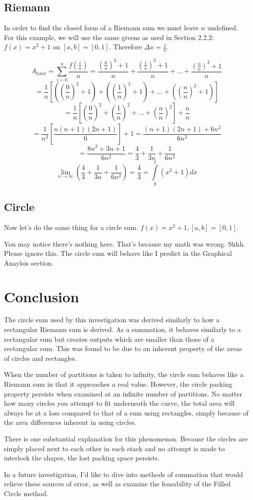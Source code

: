 \documentclass{article}
\begin{document}
    \subsection{Riemann}
      In order to find the closed form of a Riemann sum we must leave \( n \) undefined. For this example, we will use the same givens as used in Section 2.2.2: \( f(x) = x^2 + 1 \) on \( [a,b] = [0,1] \). Therefore \( \Delta x = \frac{1}{n} \).

      \[ A_{total} = \displaystyle \sum_{i=0}^n \frac{f(\frac{i}{n})}{n} = \frac{(\frac{0}{n})^2+1}{n} + \frac{(\frac{1}{n})^2+1}{n} + \dots + \frac{(\frac{n}{n})^2+1}{n} \]
      \[ = \frac{1}{n}\left[ \left( \left(\frac{0}{n}\right)^2 + 1 \right) + \left( \left(\frac{1}{n}\right)^2 + 1 \right) + \dots + \left( \left(\frac{n}{n}\right)^2 + 1 \right) \right] \]
      \[ = \frac{1}{n}\left[ \left( \frac{0}{n} \right)^2 + \left( \frac{1}{n} \right)^2 + \dots + \left( \frac{n}{n} \right)^2 \right] + \frac{n}{n} \]
      \[ = \frac{1}{n^3}\left[ \frac{n(n+1)(2n+1)}{6} \right] + 1 = \frac{(n+1)(2n+1) + 6n^2}{6n^2} \]
      \[ = \frac{8n^2+3n+1}{6n^2} = \frac{4}{3} + \frac{1}{3n} + \frac{1}{6n^2} \]
      \[ \displaystyle\lim_{n \to \infty}\left(\frac{4}{3} + \frac{1}{3n} + \frac{1}{6n^2} \right) = \frac{4}{3} = \int\limits_0^1 (x^2+1)dx \]

    \subsection{Circle}
      Now let's do the same thing for a circle sum. \( f(x) = x^2 + 1, [a,b] = [0,1] \).

      You may notice there's nothing here. That's because my math was wrong. Shhh. Please ignore this. The circle sum will behave like I predict in the Graphical Anaylsis section.

  \section{Conclusion}
    The circle sum used by this investigation was derived similarly to how a rectangular Riemann sum is derived. As a summation, it behaves similarly to a rectangular sum but creates outputs which are smaller than those of a rectangular sum. This was found to be due to an inherent property of the areas of circles and rectangles.

    When the number of partitions is taken to infinity, the circle sum behaves like a Riemann sum in that it approaches a real value. However, the circle packing property persists when examined at an infinite number of partitions. No matter how many circles you attempt to fit underneath the curve, the total area will always be at a loss compared to that of a sum using rectangles, simply because of the area differences inherent in using circles.

    There is one substantial explanation for this phenomenon. Because the circles are simply placed next to each other in each stack and no attempt is made to interlock the shapes, the lost packing space persists.

    In a future investigation, I'd like to dive into methods of summation that would relieve these sources of error, as well as examine the feasability of the Filled Circle method.
\end{document}
